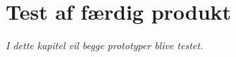 \chapter{Test af færdig produkt}\label{kap:tests}

\emph{I dette kapitel vil begge prototyper blive testet.}